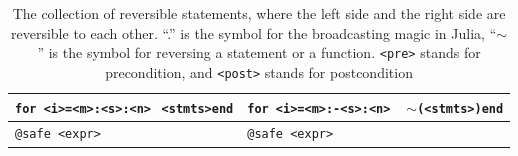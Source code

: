 \documentclass{article}
\newcommand{\<}{\langle}
\renewcommand{\>}{\rangle}
\newcommand{\cquad}{{{ }_{\quad}}}
\newcommand{\App}[1]{Appendix \ref{#1}}
\theoremstyle{definition}\newtheorem{definition}{\textit{Definition}}
\begin{document}
\begin{table}[h!]
\begin{minipage}{0.8\columnwidth}
{\begin{tabularx}{\textwidth}{X X}
            \hline
            \texttt{for <i>=<m>:<s>:<n>}\newline $\cquad$\texttt{<stmts>}\newline \texttt{end} & \texttt{for <i>=<m>:-<s>:<n>}\newline $\cquad$ \texttt{$\sim$(<stmts>)}\newline \texttt{end}\\
            \hline
            \texttt{@safe <expr>} & \texttt{@safe <expr>}\\
            \bottomrule
        \end{tabularx}
    }
    \caption{The collection of reversible statements, where the left side and the right side are reversible to each other.
    ``.'' is the symbol for the broadcasting magic in Julia,
    ``$\sim$'' is the symbol for reversing a statement or a function.
    \texttt{<pre>} stands for precondition, and \texttt{<post>} stands for postcondition
}\label{tbl:revstatements}
\end{minipage}
\end{table}

\end{document}
